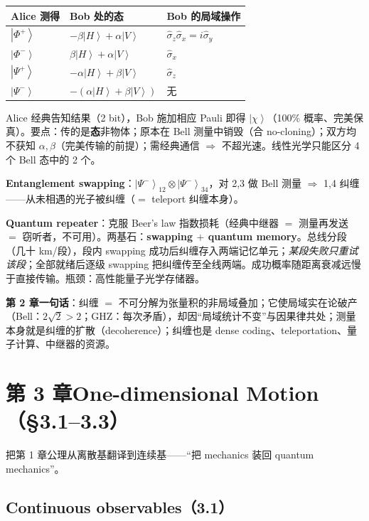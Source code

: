 \documentclass[11pt]{ctexart}
\newcommand{\ket}[1]{\left|#1\right\rangle}
\newcommand{\op}[1]{\hat{#1}}
\begin{document}
\begin{center}
\begin{tabular}{lll}
\toprule
Alice 测得 & Bob 处的态 & Bob 的局域操作\\
\midrule
$\ket{\Phi^+}$ & $-\beta\ket H+\alpha\ket V$ & $\op\sigma_z\op\sigma_x=i\op\sigma_y$\\
$\ket{\Phi^-}$ & $\beta\ket H+\alpha\ket V$ & $\op\sigma_x$\\
$\ket{\Psi^+}$ & $-\alpha\ket H+\beta\ket V$ & $\op\sigma_z$\\
$\ket{\Psi^-}$ & $-(\alpha\ket H+\beta\ket V)$ & 无\\
\bottomrule
\end{tabular}
\end{center}

Alice 经典告知结果（2 bit），Bob 施加相应 Pauli 即得 $\ket\chi$（100\% 概率、完美保真）。要点：传的是\textbf{态}非物体；原本在 Bell 测量中销毁（合 no-cloning）；双方均不获知 $\alpha,\beta$（完美传输的前提）；需经典通信 $\Rightarrow$ 不超光速。线性光学只能区分 4 个 Bell 态中的 2 个。

\textbf{Entanglement swapping}：$\ket{\Psi^-}_{12}\otimes\ket{\Psi^-}_{34}$，对 2,3 做 Bell 测量 $\Rightarrow$ 1,4 纠缠——从未相遇的光子被纠缠（$=$ teleport 纠缠本身）。

\textbf{Quantum repeater}：克服 Beer's law 指数损耗（经典中继器 $=$ 测量再发送 $=$ 窃听者，不可用）。两基石：\textbf{swapping $+$ quantum memory}。总线分段（几十 km/段），段内 swapping 成功后纠缠存入两端记忆单元；\emph{某段失败只重试该段}；全部就绪后逐级 swapping 把纠缠传至全线两端。成功概率随距离衰减远慢于直接传输。瓶颈：高性能量子光学存储器。

\textbf{第 2 章一句话}：纠缠 $=$ 不可分解为张量积的非局域叠加；它使局域实在论破产（Bell：$2\sqrt2>2$；GHZ：每次矛盾），却因``局域统计不变''与因果律共处；测量本身就是纠缠的扩散（decoherence）；纠缠也是 dense coding、teleportation、量子计算、中继器的资源。

\section{第 3 章\quad One-dimensional Motion（\S3.1--3.3）}

把第 1 章公理从离散基翻译到连续基——``把 mechanics 装回 quantum mechanics''。

\subsection{Continuous observables（3.1）}
\end{document}
